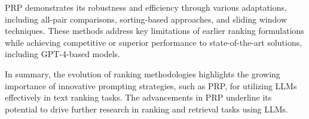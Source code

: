 PRP demonstrates its robustness and efficiency through various adaptations, including all-pair comparisons, sorting-based approaches, and sliding window techniques. These methods address key limitations of earlier ranking formulations while achieving competitive or superior performance to state-of-the-art solutions, including GPT-4-based models.

In summary, the evolution of ranking methodologies highlights the growing importance of innovative prompting strategies, such as PRP, for utilizing LLMs effectively in text ranking tasks. The advancements in PRP underline its potential to drive further research in ranking and retrieval tasks using LLMs.
